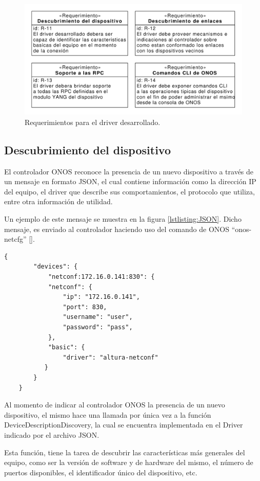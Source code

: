   \begin{figure}[H]
    \centering
    \includegraphics[scale=0.65]{Figures/req_driver.pdf}
    \caption{Requerimientos para el driver desarrollado.}
    \label{fig:req_driver}
  \end{figure}

  \subsection{Descubrimiento del dispositivo}
  El controlador ONOS reconoce la presencia de un nuevo dispositivo a través de un mensaje en formato JSON, el cual contiene información como la dirección IP del equipo, el driver que describe sus comportamientos, el protocolo que utiliza, entre otra información de utilidad. 
  
  Un ejemplo de este mensaje se muestra en la figura \ref{lstlisting:JSON}. Dicho mensaje, es enviado al controlador haciendo uso del comando de ONOS “onos-netcfg” [].

  \begin{lstlisting}[language=SHELXL, caption=Mensaje JSON con información del dispositivo., label=lstlisting:JSON]
    {
        "devices": {
            "netconf:172.16.0.141:830": {
            "netconf": {
                "ip": "172.16.0.141",
                "port": 830,
                "username": "user",
                "password": "pass",
            },
            "basic": {
                "driver": "altura-netconf"
           }
        }
    }
    \end{lstlisting}


    Al momento de indicar al controlador ONOS la presencia de un nuevo dispositivo, el mismo hace una llamada por única vez a la función DeviceDescriptionDiscovery, la cual se encuentra implementada en el Driver indicado por el archivo JSON. 

    Esta función, tiene la tarea de descubrir las características más generales del equipo, como ser la versión de software y de hardware del mismo, el número de puertos disponibles, el identificador único del dispositivo, etc.

